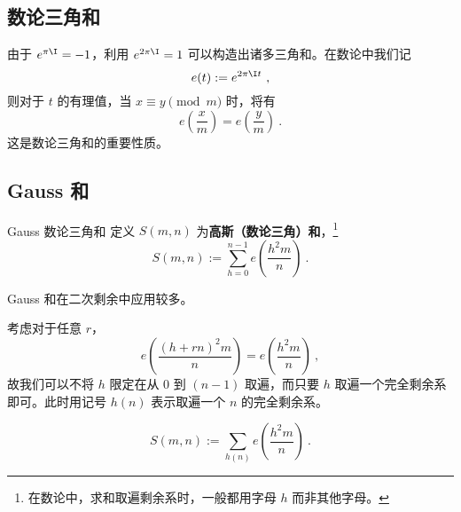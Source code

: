 
\subsection{数论三角和}
由于 $e^{\pi \I} = -1$，利用 $e^{2\pi \I} = 1$ 可以构造出诸多三角和。在数论中我们记
\begin{equation}
e(t) := e^{2\pi \I t} ~,
\end{equation}
则对于 $t$ 的有理值，当 $x \equiv y \pmod m$ 时，将有
\begin{equation}
e\left(\frac{x}{m}\right) = e\left(\frac{y}{m}\right) ~.
\end{equation}
这是数论三角和的重要性质。

\subsection{Gauss 和}
\begin{definition}{Gauss 数论三角和}
定义 $S(m, n)$ 为\textbf{高斯（数论三角）和}，\footnote{在数论中，求和取遍剩余系时，一般都用字母 $h$ 而非其他字母。}
\begin{equation}
S(m, n) := \sum_{h = 0}^{n-1} e\left(\frac{h^2m}{n}\right) ~.
\end{equation}

\end{definition}
Gauss 和在二次剩余中应用较多。

考虑对于任意 $r$，
\begin{equation}
e\left(\frac{(h + rn)^2m}{n}\right) = e\left(\frac{h^2m}{n}\right) ~,
\end{equation}
故我们可以不将 $h$ 限定在从 $0$ 到 $(n-1)$ 取遍，而只要 $h$ 取遍一个完全剩余系即可。此时用记号 $h(n)$ 表示取遍一个 $n$ 的完全剩余系。
\begin{corollary}{}
\begin{equation}
S(m, n) := \sum_{h(n)} e\left(\frac{h^2 m}{n}\right) ~.
\end{equation}

\end{corollary}

